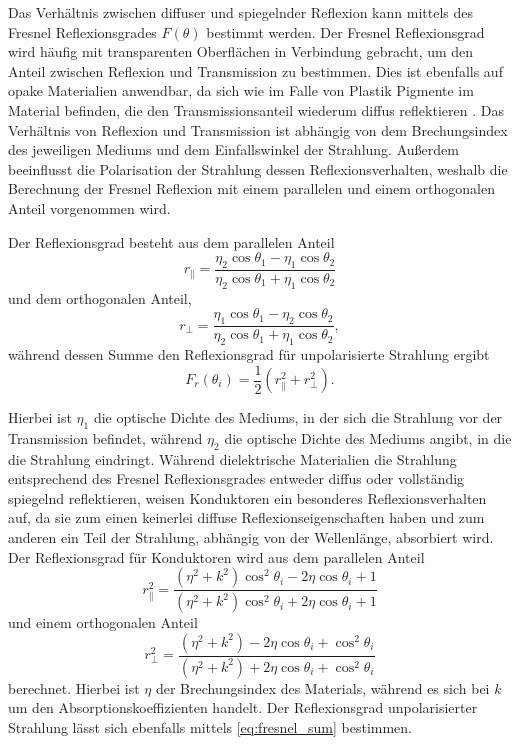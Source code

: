 \documentclass[thesis.tex]{subfiles}
\begin{document}
Das Verhältnis zwischen diffuser und spiegelnder Reflexion kann mittels des Fresnel Reflexionsgrades $F(\theta)$ bestimmt werden. Der Fresnel Reflexionsgrad wird häufig mit transparenten Oberflächen in Verbindung gebracht, um den Anteil zwischen Reflexion und Transmission zu bestimmen. Dies ist ebenfalls auf opake Materialien anwendbar, da sich wie im Falle von Plastik Pigmente im Material befinden, die den Transmissionsanteil wiederum diffus reflektieren \cite{bib:CookTorrance1981}. Das Verhältnis von Reflexion und Transmission ist abhängig von dem Brechungsindex des jeweiligen Mediums und dem Einfallswinkel der Strahlung. Außerdem beeinflusst die Polarisation der Strahlung dessen Reflexionsverhalten, weshalb die Berechnung der Fresnel Reflexion mit einem parallelen und einem orthogonalen Anteil vorgenommen wird.

Der Reflexionsgrad besteht aus dem parallelen Anteil
\begin{equation}
r_\parallel = \frac{\eta_2\cos\theta_1 - \eta_1\cos\theta_2}{\eta_2\cos\theta_1+\eta_1\cos\theta_2}
\end{equation}
und dem orthogonalen Anteil,
\begin{equation}
r_\perp = \frac{\eta_1 \cos\theta_1 - \eta_2\cos\theta_2}{\eta_2\cos\theta_1+\eta_1\cos\theta_2},
\end{equation}
während dessen Summe den Reflexionsgrad für unpolarisierte Strahlung ergibt 
\begin{equation}
F_r(\theta_i) = \frac{1}{2}(r_\parallel^2 + r_\perp^2).
\label{eq:fresnel_sum}
\end{equation}

Hierbei ist $\eta_1$ die optische Dichte des Mediums, in der sich die Strahlung vor der Transmission befindet, während $\eta_2$ die optische Dichte des Mediums angibt, in die die Strahlung eindringt. Während dielektrische Materialien die Strahlung entsprechend des Fresnel Reflexionsgrades entweder diffus oder vollständig spiegelnd reflektieren, weisen Konduktoren ein besonderes Reflexionsverhalten auf, da sie zum einen keinerlei diffuse Reflexionseigenschaften haben und zum anderen ein Teil der Strahlung, abhängig von der Wellenlänge, absorbiert wird. Der Reflexionsgrad für Konduktoren wird aus dem parallelen Anteil
\begin{equation}
r_\parallel^2 = \frac{(\eta^2 + k^2)\cos^2\theta_i - 2\eta\cos\theta_i + 1}{(\eta^2 + k^2)\cos^2\theta_i + 2\eta\cos\theta_i + 1}
\end{equation}
und einem orthogonalen Anteil
\begin{equation}
r_\perp^2 = \frac{(\eta^2 + k^2)-2\eta\cos\theta_i+\cos^2\theta_i}{(\eta^2 + k^2)+2\eta\cos\theta_i+\cos^2\theta_i}
\end{equation}
berechnet. Hierbei ist $\eta$ der Brechungsindex des Materials, während es sich bei $k$ um den Absorptionskoeffizienten handelt. Der Reflexionsgrad unpolarisierter Strahlung lässt sich ebenfalls mittels \autoref{eq:fresnel_sum} bestimmen.
\end{document}
